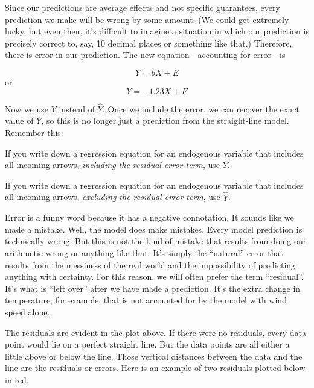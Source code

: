\documentclass[
]{book}
\begin{document}
Since our predictions are average effects and not specific guarantees, every prediction we make will be wrong by some amount. (We could get extremely lucky, but even then, it's difficult to imagine a situation in which our prediction is precisely correct to, say, 10 decimal places or something like that.) Therefore, there is error in our prediction. The new equation---accounting for error---is

\[
Y = bX + E
\]
or
\[
Y = -1.23X + E
\]

Now we use \(Y\) instead of \(\hat{Y}\). Once we include the error, we can recover the exact value of \(Y\), so this is no longer just a prediction from the straight-line model. Remember this:

If you write down a regression equation for an endogenous variable that includes all incoming arrows, \emph{including the residual error term}, use \(Y\).

If you write down a regression equation for an endogenous variable that includes all incoming arrows, \emph{excluding the residual error term}, use \(\hat{Y}\).

Error is a funny word because it has a negative connotation. It sounds like we made a mistake. Well, the model does make mistakes. Every model prediction is technically wrong. But this is not the kind of mistake that results from doing our arithmetic wrong or anything like that. It's simply the ``natural'' error that results from the messiness of the real world and the impossibility of predicting anything with certainty. For this reason, we will often prefer the term ``residual''. It's what is ``left over'' after we have made a prediction. It's the extra change in temperature, for example, that is not accounted for by the model with wind speed alone.

The residuals are evident in the plot above. If there were no residuals, every data point would lie on a perfect straight line. But the data points are all either a little above or below the line. Those vertical distances between the data and the line are the residuals or errors. Here is an example of two residuals plotted below in red.
\end{document}
